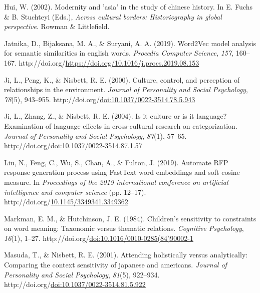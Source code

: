 \documentclass[10pt, letterpaper]{article}
\newenvironment{CSLReferences}%
  {}%
  {\par}
\begin{document}
\begin{CSLReferences}{1}{0}
\leavevmode{}%
Hui, W. (2002). Modernity and 'asia' in the study of chinese history. In
E. Fuchs \& B. Stuchteyi (Eds.), \emph{Across cultural borders:
Historiography in global perspective}. Rowman \& Littlefield.

\leavevmode{}%
Jatnika, D., Bijaksana, M. A., \& Suryani, A. A. (2019). Word2Vec model
analysis for semantic similarities in english words. \emph{Procedia
Computer Science}, \emph{157}, 160--167.
http://doi.org/\url{https://doi.org/10.1016/j.procs.2019.08.153}

\leavevmode{}%
Ji, L., Peng, K., \& Nisbett, R. E. (2000). Culture, control, and
perception of relationships in the environment. \emph{Journal of
Personality and Social Psychology}, \emph{78}(5), 943--955.
http://doi.org/\href{https://doi.org/doi:10.1037/0022-3514.78.5.943}{doi:10.1037/0022-3514.78.5.943}

\leavevmode{}%
Ji, L., Zhang, Z., \& Nisbett, R. E. (2004). Is it culture or is it
language? Examination of language effects in cross-cultural research on
categorization. \emph{Journal of Personality and Social Psychology},
\emph{87}(1), 57--65.
http://doi.org/\href{https://doi.org/doi:10.1037/0022-3514.87.1.57}{doi:10.1037/0022-3514.87.1.57}

\leavevmode{}%
Liu, N., Feng, C., Wu, S., Chan, A., \& Fulton, J. (2019). Automate RFP
response generation process using FastText word embeddings and soft
cosine measure. In \emph{Proceedings of the 2019 international
conference on artificial intelligence and computer science} (pp.
12--17).
http://doi.org/\href{https://doi.org/10.1145/3349341.3349362}{10.1145/3349341.3349362}

\leavevmode{}%
Markman, E. M., \& Hutchinson, J. E. (1984). Children's sensitivity to
constraints on word meaning: Taxonomic versus thematic relations.
\emph{Cognitive Psychology}, \emph{16}(1), 1--27.
http://doi.org/\href{https://doi.org/doi:10.1016/0010-0285(84)90002-1}{doi:10.1016/0010-0285(84)90002-1}

\leavevmode{}%
Masuda, T., \& Nisbett, R. E. (2001). Attending holistically versus
analytically: Comparing the context sensitivity of japanese and
americans. \emph{Journal of Personality and Social Psychology},
\emph{81}(5), 922--934.
http://doi.org/\href{https://doi.org/doi:10.1037/0022-3514.81.5.922}{doi:10.1037/0022-3514.81.5.922}


\end{CSLReferences}
\end{document}
